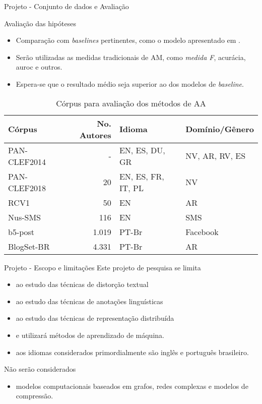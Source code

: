 \begin{frame}{Projeto - Conjunto de dados e Avaliação}

\begin{block}{Avaliação das hipóteses}
	\begin{itemize}
		\item Comparação com {\it baselines} pertinentes, como o modelo apresentado em .
		\item Serão utilizadas as medidas tradicionais de AM, como {\it medida F}, acurácia, auroc e outros.
		\item Espera-se que o resultado médio seja superior ao dos modelos de {\it baseline}.
	\end{itemize}
\end{block}

\setlength{\tabcolsep}{4pt}\selectFont
\begin{table}[!htbp]
	\centering
	\caption{Córpus para avaliação dos métodos de AA}
	\begin{tabular}{l|rll}
		\toprule
		Córpus       & No. Autores & Idioma             & Domínio/Gênero \\ \midrule
		PAN-CLEF2014 &           - & EN, ES, DU, GR     & NV, AR, RV, ES \\ \hline
		PAN-CLEF2018 &          20 & EN, ES, FR, IT, PL & NV             \\ \hline
		RCV1         &          50 & EN                 & AR             \\ \hline
		Nus-SMS      &         116 & EN                 & SMS            \\ \hline
		b5-post      &       1.019 & PT-Br              & Facebook       \\ \hline
		BlogSet-BR   &       4.331 & PT-Br              & AR             \\ \bottomrule
	\end{tabular}
	\label{tab.results}
\end{table}

\end{frame}

\begin{frame}{Projeto - Escopo e limitações}
	Este projeto de pesquisa se limita
	\begin{itemize}
		\item ao estudo das técnicas de distorção textual
		\item ao estudo das técnicas de anotações linguísticas
		\item ao estudo das técnicas de representação distribuída
		\item e utilizará métodos de aprendizado de máquina.
		\item aos idiomas considerados primordialmente são inglês e português brasileiro.
	\end{itemize}

	Não serão considerados
	\begin{itemize}
		\item  modelos computacionais baseados em grafos, redes complexas e modelos de compressão.
	\end{itemize}
\end{frame}

